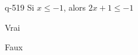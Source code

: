 \begin{truefalse}{q-519}
Si $x \leq -1$, alors $2x+1\leq -1$
\item* Vrai
\item Faux
\end{truefalse}

